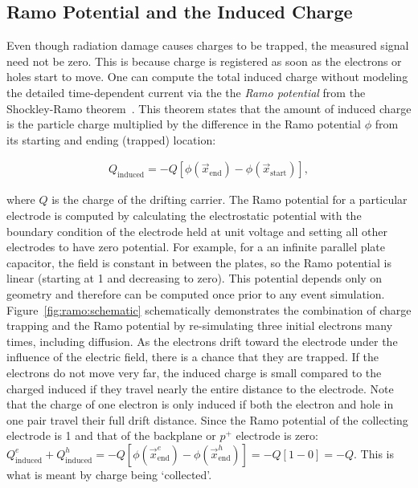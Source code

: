 \subsection{Ramo Potential and the Induced Charge}
\label{sec:ramo}

Even though radiation damage causes charges to be trapped, the measured signal need not be zero.  This is because charge is registered as soon as the electrons or holes start to move.  One can compute the total induced charge without modeling the detailed time-dependent current via the the \textit{Ramo potential} from the Shockley-Ramo theorem~\cite{Shockley,Ramo}.  This theorem states that the amount of induced charge is the particle charge multiplied by the difference in the Ramo potential $\phi$ from its starting and ending (trapped) location:

\begin{align}
\label{eq:ramo}
Q_\text{induced} = -Q[\phi(\vec{x}_\text{end})-\phi(\vec{x}_\text{start})],
\end{align}

where $Q$ is the charge of the drifting carrier.  The Ramo potential for a particular electrode is computed by calculating the electrostatic potential with the boundary condition of the electrode held at unit voltage and setting all other electrodes to have zero potential.  For example, for a an infinite parallel plate capacitor, the field is constant in between the plates, so the Ramo potential is linear (starting at 1 and decreasing to zero).  This potential depends only on geometry and therefore can be computed once prior to any event simulation.   Figure~\ref{fig:ramo:schematic} schematically demonstrates the combination of charge trapping and the Ramo potential by re-simulating three initial electrons many times, including diffusion.  As the electrons drift toward the electrode under the influence of the electric field, there is a chance that they are trapped.  If the electrons do not move very far, the induced charge is small compared to the charged induced if they travel nearly the entire distance to the electrode.  Note that the charge of one electron is only induced if both the electron and hole in one pair travel their full drift distance.  Since the Ramo potential of the collecting electrode is 1 and that of the backplane or $p^+$ electrode is zero: $Q_\text{induced}^e+Q_\text{induced}^h=-Q[\phi(\vec{x}_\text{end}^e)-\phi(\vec{x}_\text{end}^h)]=-Q[1-0]=-Q$.  This is what is meant by charge being `collected'.

